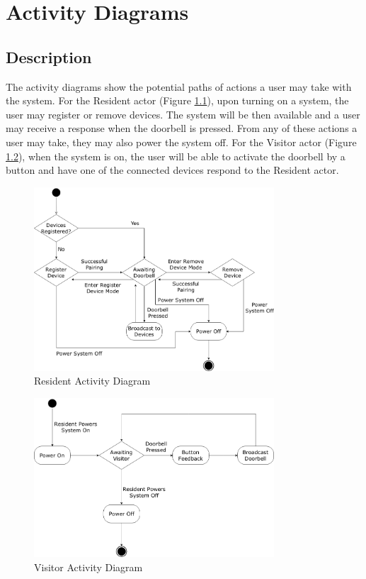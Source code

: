 \chapter{Activity Diagrams}

\section{Description}
The activity diagrams show the potential paths of actions a user may take with the system. For the Resident actor (Figure \ref{fig:residentdiagram}), upon turning on a system, the user may register or remove devices. The system will be then available and a user may receive a response when the doorbell is pressed. From any of these actions a user may take, they may also power the system off. For the Visitor actor (Figure \ref{fig:visitordiagram}), when the system is on, the user will be able to activate the doorbell by a button and have one of the connected devices respond to the Resident actor.

\begin{figure}[h]
  \includegraphics[width=0.8\textwidth]{ResidentActivityDiagram.png}
  \centering
  \caption{Resident Activity Diagram}
  \label{fig:residentdiagram}
\end{figure}

\begin{figure}[h]
  \includegraphics[width=0.8\textwidth]{VisitorActivityDiagram.png}
  \centering
  \caption{Visitor Activity Diagram}
  \label{fig:visitordiagram}
\end{figure}